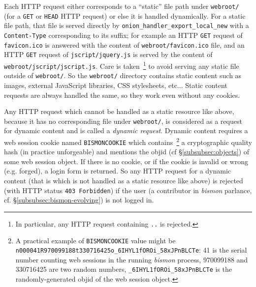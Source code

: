 Each HTTP request   either
corresponds to a ``static'' file path under \texttt{webroot/} (for a
\texttt{GET} or \texttt{HEAD} HTTP request) or else it is handled
dynamically. For a static file path, that file is served directly by
\texttt{onion\_handler\_export\_local\_new} with a
\texttt{Content-Type} corresponding to its suffix; for example an HTTP
\texttt{GET} request of \texttt{favicon.ico} is answered with the
content of \texttt{webroot/favicon.ico} file, and an HTTP \texttt{GET}
request of \texttt{jscript/jquery.js} is served by the content of
\texttt{webroot/jscript/jscript.js}. Care is taken~\footnote{In
  particular, any HTTP request containing \texttt{..} is rejected.} to
avoid serving any static file outside of \texttt{webroot/}. So the
\texttt{webroot/} directory contains static content such as images,
external JavaScript libraries, CSS stylesheets, etc... Static content
requests are always handled the same, so they work even without any
cookies.  

Any HTTP request which cannot be handled as a static resource like
above, because it has no corresponding file under \texttt{webroot/},
is considered as a request for dynamic content and is called a
  \emph{dynamic
  request}. Dynamic content requires a web session 
 cookie  
named \texttt{BISMONCOOKIE} which contains~\footnote{A practical
  example of \texttt{BISMONCOOKIE} value might be
  \texttt{n000041R970099188t330716425o\_6IHYL1fOROi\_58xJPnBLCTe}: 41
  is the serial number counting web sessions in the running
  \emph{bismon} process, 970099188 and 330716425 are two random
  numbers, \texttt{\_6IHYL1fOROi\_58xJPnBLCTe} is the
  randomly-generated objid of the web session object.} a cryptographic
quality hash (in practice unforgeable) and mentions the objid
 (cf §\ref{subsubsec:objects}) of some web session
object. If there is no cookie, or if the  cookie is
invalid or wrong (e.g. forged), a login  form is
returned. So any HTTP request for a dynamic content (that is which is
not handled as a static resource like above) is rejected (with HTTP
status \texttt{403 Forbidden}) if the user (a 
contributor in \emph{bismon} parlance,
cf. §\ref{subsubsec:bismon-evolving}) is not logged in.

